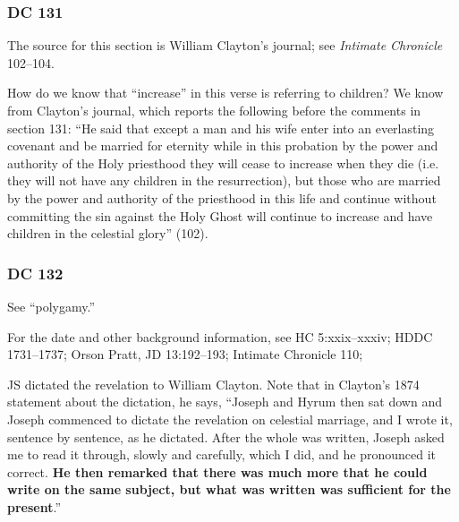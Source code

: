 	\subsubsection{DC 131} %
	
		The source for this section is William Clayton's journal; see \textit{Intimate Chronicle} 102--104.
	
		\begin{compactdesc}
		
		\item[4$\vert$] %
		\begin{compactdesc}
		\item[``increase'' as children] How do we know that ``increase'' in this verse is referring to children? We know from Clayton's journal, which reports the following before the comments in section 131:
			``He said that except a man and his wife enter into an everlasting covenant and be married for eternity while in this probation by the power and authority of the Holy priesthood they will cease to increase when they die (i.e. they will not have any children in the resurrection), but those who are married by the power and authority of the priesthood in this life and continue without committing the sin against the Holy Ghost will continue to increase and have children in the celestial glory'' (102).
		\end{compactdesc}
		
		\end{compactdesc}
		
	\subsubsection{DC 132} %
	
		See ``polygamy.''
	
		For the date and other background information, see HC 5:xxix--xxxiv; HDDC 1731--1737; Orson Pratt, JD 13:192--193; Intimate Chronicle 110; 
		
		JS dictated the revelation to William Clayton. Note that in Clayton's 1874 statement about the dictation, he says, ``Joseph and Hyrum then sat down and Joseph commenced to dictate the revelation on celestial marriage, and I wrote it, sentence by sentence, as he dictated. After the whole was written, Joseph asked me to read it through, slowly and carefully, which I did, and he pronounced it correct. \textbf{He then remarked that there was much more that he could write on the same subject, but what was written was sufficient for the present}.''
		
